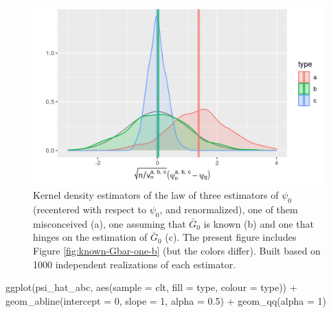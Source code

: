 \documentclass[
  11pt,
  openright,twoside]{book}
\newenvironment{Shaded}{\begin{snugshade}}{\end{snugshade}}
\newcommand{\AttributeTok}[1]{\textcolor[rgb]{0.77,0.63,0.00}{#1}}
\newcommand{\DecValTok}[1]{\textcolor[rgb]{0.00,0.00,0.81}{#1}}
\newcommand{\FloatTok}[1]{\textcolor[rgb]{0.00,0.00,0.81}{#1}}
\newcommand{\FunctionTok}[1]{\textcolor[rgb]{0.00,0.00,0.00}{#1}}
\newcommand{\NormalTok}[1]{#1}
\newcommand{\SpecialCharTok}[1]{\textcolor[rgb]{0.00,0.00,0.00}{#1}}
\newcommand{\Gbar}{\bar{G}}
\theoremstyle{definition}
\theoremstyle{definition}
\theoremstyle{definition}
\theoremstyle{definition}
\theoremstyle{remark}
\begin{document}
\begin{figure}

{\centering \includegraphics[width=0.7\linewidth]{img/unknown-Gbar-three-1} 

}

\caption{Kernel density estimators of the law of three estimators of \(\psi_{0}\) (recentered with respect to \(\psi_{0}\), and renormalized), one of them misconceived (a), one assuming that \(\Gbar_{0}\) is known (b) and one that hinges on the estimation of \(\Gbar_{0}\) (c). The present figure includes Figure \ref{fig:known-Gbar-one-b} (but the colors differ). Built based on 1000 independent realizations of each estimator.}\label{fig:unknown-Gbar-three}
\end{figure}



\begin{Shaded}
\begin{Highlighting}[]
\FunctionTok{ggplot}\NormalTok{(psi\_hat\_abc, }\FunctionTok{aes}\NormalTok{(}\AttributeTok{sample =}\NormalTok{ clt, }\AttributeTok{fill =}\NormalTok{ type, }\AttributeTok{colour =}\NormalTok{ type)) }\SpecialCharTok{+}
  \FunctionTok{geom\_abline}\NormalTok{(}\AttributeTok{intercept =} \DecValTok{0}\NormalTok{, }\AttributeTok{slope =} \DecValTok{1}\NormalTok{, }\AttributeTok{alpha =} \FloatTok{0.5}\NormalTok{) }\SpecialCharTok{+}
  \FunctionTok{geom\_qq}\NormalTok{(}\AttributeTok{alpha =} \DecValTok{1}\NormalTok{)}
\end{Highlighting}
\end{Shaded}
\end{document}
